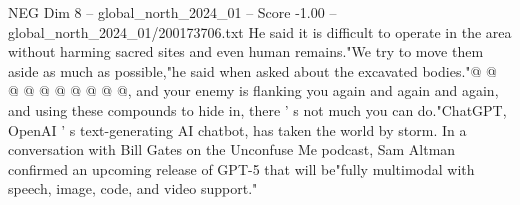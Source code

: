 \begin{textsample}{NEG Dim 8 – global\_north\_2024\_01 – Score -1.00 – global\_north\_2024\_01/200173706.txt}
He said it is difficult to operate in the area without harming sacred sites and even human remains."We try to move them aside as much as possible,"he said when asked about the excavated bodies."@ @ @ @ @ @ @ @ @ @, and your enemy is flanking you again and again and again, and using these compounds to hide in, there ' s not much you can do."ChatGPT, OpenAI ' s text-generating AI chatbot, has taken the world by storm.
In a conversation with Bill Gates on the Unconfuse Me podcast, Sam Altman confirmed an upcoming release of GPT-5 that will be"fully multimodal with speech, image, code, and video support."

\end{textsample}
